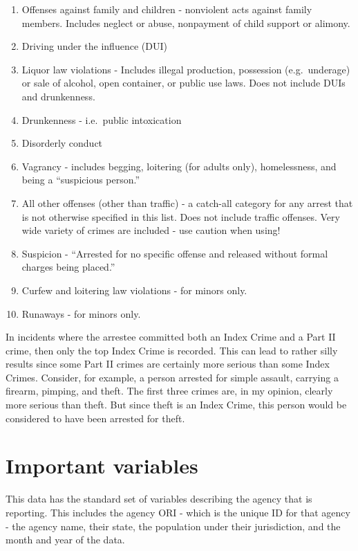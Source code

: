 \documentclass[
]{krantz}
\providecommand{\tightlist}{%
  \setlength{\itemsep}{0pt}\setlength{\parskip}{0pt}}
\begin{document}
\begin{enumerate}
\def\labelenumi{\arabic{enumi}.}
\setcounter{enumi}{19}
\tightlist
\item
  Offenses against family and children - nonviolent acts
  against family members. Includes neglect or abuse,
  nonpayment of child support or alimony.
\item
  Driving under the influence (DUI)
\item
  Liquor law violations - Includes illegal production,
  possession (e.g.~underage) or sale of alcohol, open
  container, or public use laws. Does not include DUIs and
  drunkenness.
\item
  Drunkenness - i.e.~public intoxication
\item
  Disorderly conduct
\item
  Vagrancy - includes begging, loitering (for adults only),
  homelessness, and being a ``suspicious person.''
\item
  All other offenses (other than traffic) - a catch-all
  category for any arrest that is not otherwise specified in
  this list. Does not include traffic offenses. Very wide
  variety of crimes are included - use caution when using!
\item
  Suspicion - ``Arrested for no specific offense and
  released without formal charges being placed.''
\item
  Curfew and loitering law violations - for minors only.
\item
  Runaways - for minors only.
\end{enumerate}

In incidents where the arrestee committed both an Index
Crime and a Part II crime, then only the top Index Crime is
recorded. This can lead to rather silly results since some
Part II crimes are certainly more serious than some Index
Crimes. Consider, for example, a person arrested for simple
assault, carrying a firearm, pimping, and theft. The first
three crimes are, in my opinion, clearly more serious than
theft. But since theft is an Index Crime, this person would
be considered to have been arrested for theft.

\section{Important variables}\label{important-variables-2}

This data has the standard set of variables describing the
agency that is reporting. This includes the agency ORI -
which is the unique ID for that agency - the agency name,
their state, the population under their jurisdiction, and
the month and year of the data.
\end{document}
